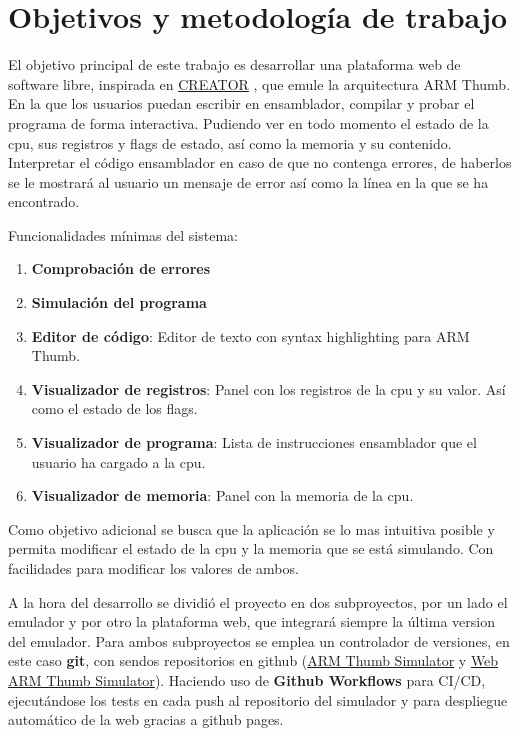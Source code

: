 \section{Objetivos y metodología de trabajo}
{
    El objetivo principal de este trabajo es desarrollar una plataforma web de software libre, inspirada en \href{https://creatorsim.github.io/creator/}{CREATOR} , que emule la arquitectura ARM Thumb. En la que los usuarios puedan escribir en ensamblador, compilar y probar el programa de forma interactiva.
    Pudiendo ver en todo momento el estado de la cpu, sus registros y flags de estado, así como la memoria y su contenido. \\

    Interpretar el código ensamblador en caso de que no contenga errores, de haberlos se le mostrará al usuario un mensaje de error así como la línea en la que se ha encontrado. 
    
    Funcionalidades mínimas del sistema:
    \begin{enumerate}
        \item \textbf{Comprobación de errores}
        \item \textbf{Simulación del programa}
        \item \textbf{Editor de código}: Editor de texto con syntax highlighting para ARM Thumb.
        \item \textbf{Visualizador de registros}: Panel con los registros de la cpu y su valor. Así como el estado de los flags.
        \item \textbf{Visualizador de programa}: Lista de instrucciones ensamblador que el usuario ha cargado a la cpu.
        \item \textbf{Visualizador de memoria}: Panel con la memoria de la cpu.
    \end{enumerate}

    Como objetivo adicional se busca que la aplicación se lo mas intuitiva posible y permita modificar el estado de la cpu y la memoria que se está simulando. Con facilidades para modificar los valores de ambos. \\
    \clearpage

    A la hora del desarrollo se dividió el proyecto en dos subproyectos, por un lado el emulador y por otro la plataforma web, que integrará siempre la última version del emulador.
    Para ambos subproyectos se emplea un controlador de versiones, en este caso \textbf{git}, con sendos repositorios en github (\href{https://github.com/FreddyJS/armthumb-emul}{ARM Thumb Simulator} y \href{https://github.com/FreddyJS/wthumb}{Web ARM Thumb Simulator}).
    Haciendo uso de \textbf{Github Workflows} para CI/CD, ejecutándose los tests en cada push al repositorio del simulador y para despliegue automático de la web
    gracias a github pages. \\

}
